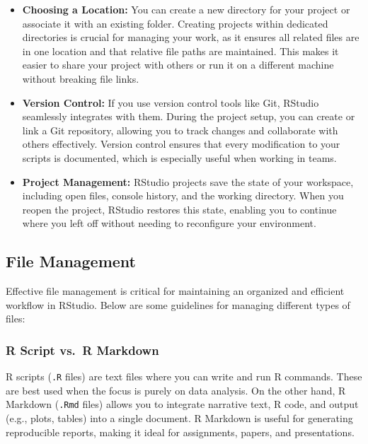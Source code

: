 \documentclass[
]{book}
\begin{document}
\begin{itemize}
\item
  \textbf{Choosing a Location:} You can create a new directory for your project or associate it with an existing folder. Creating projects within dedicated directories is crucial for managing your work, as it ensures all related files are in one location and that relative file paths are maintained. This makes it easier to share your project with others or run it on a different machine without breaking file links.
\item
  \textbf{Version Control:} If you use version control tools like Git, RStudio seamlessly integrates with them. During the project setup, you can create or link a Git repository, allowing you to track changes and collaborate with others effectively. Version control ensures that every modification to your scripts is documented, which is especially useful when working in teams.
\item
  \textbf{Project Management:} RStudio projects save the state of your workspace, including open files, console history, and the working directory. When you reopen the project, RStudio restores this state, enabling you to continue where you left off without needing to reconfigure your environment.
\end{itemize}

\subsection*{File Management}\label{file-management}

Effective file management is critical for maintaining an organized and efficient workflow in RStudio. Below are some guidelines for managing different types of files:

\subsubsection*{R Script vs.~R Markdown}\label{r-script-vs.-r-markdown}

R scripts (\texttt{.R} files) are text files where you can write and run R commands. These are best used when the focus is purely on data analysis. On the other hand, R Markdown (\texttt{.Rmd} files) allows you to integrate narrative text, R code, and output (e.g., plots, tables) into a single document. R Markdown is useful for generating reproducible reports, making it ideal for assignments, papers, and presentations.
\end{document}
